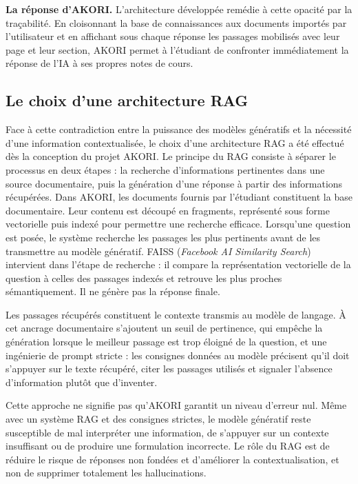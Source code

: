 \documentclass[12pt,a4paper,oneside]{report}
\begin{document}
\textbf{La réponse d'AKORI.} L'architecture développée remédie à cette opacité par la traçabilité. En cloisonnant la base de connaissances aux documents importés par l'utilisateur et en affichant sous chaque réponse les passages mobilisés avec leur page et leur section, AKORI permet à l'étudiant de confronter immédiatement la réponse de l'IA à ses propres notes de cours.

\subsection*{Le choix d'une architecture RAG}

Face à cette contradiction entre la puissance des modèles génératifs et la nécessité d'une information contextualisée, le choix d'une architecture RAG a été effectué dès la conception du projet AKORI. Le principe du RAG consiste à séparer le processus en deux étapes : la recherche d'informations pertinentes dans une source documentaire, puis la génération d'une réponse à partir des informations récupérées. Dans AKORI, les documents fournis par l'étudiant constituent la base documentaire. Leur contenu est découpé en fragments, représenté sous forme vectorielle puis indexé pour permettre une recherche efficace. Lorsqu'une question est posée, le système recherche les passages les plus pertinents avant de les transmettre au modèle génératif. FAISS (\emph{Facebook AI Similarity Search}) intervient dans l'étape de recherche \cite{johnson2021faiss} : il compare la représentation vectorielle de la question à celles des passages indexés et retrouve les plus proches sémantiquement. Il ne génère pas la réponse finale.

Les passages récupérés constituent le contexte transmis au modèle de langage. À cet ancrage documentaire s'ajoutent un seuil de pertinence, qui empêche la génération lorsque le meilleur passage est trop éloigné de la question, et une ingénierie de prompt stricte : les consignes données au modèle précisent qu'il doit s'appuyer sur le texte récupéré, citer les passages utilisés et signaler l'absence d'information plutôt que d'inventer.

Cette approche ne signifie pas qu'AKORI garantit un niveau d'erreur nul. Même avec un système RAG et des consignes strictes, le modèle génératif reste susceptible de mal interpréter une information, de s'appuyer sur un contexte insuffisant ou de produire une formulation incorrecte. Le rôle du RAG est de réduire le risque de réponses non fondées et d'améliorer la contextualisation, et non de supprimer totalement les hallucinations.
\end{document}
